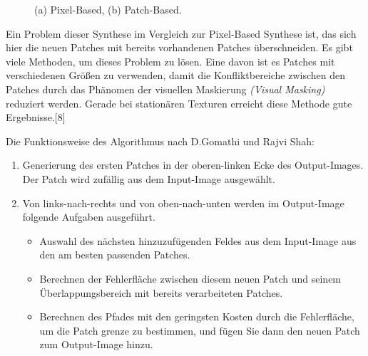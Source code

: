 \documentclass[12pt]{report}
\begin{document}
\begin{figure}[H]
    \centering
    \qquad
    \caption{(a) Pixel-Based, (b) Patch-Based.}%
\end{figure}

Ein Problem dieser Synthese im Vergleich zur Pixel-Based Synthese ist, das sich hier die neuen Patches mit bereits vorhandenen Patches überschneiden.
Es gibt viele Methoden, um dieses Problem zu lösen.
Eine davon ist es Patches mit verschiedenen Größen zu verwenden, damit die Konfliktbereiche zwischen den Patches durch das Phänomen der visuellen Maskierung
\textit{(Visual Masking)} reduziert werden.
Gerade bei stationären Texturen erreicht diese Methode gute Ergebnisse.{[8]}

Die Funktionsweise des Algorithmus nach D.Gomathi und Rajvi Shah:

\begin{enumerate}
    \item Generierung des ersten Patches in der oberen-linken Ecke des Output-Images. Der Patch wird zufällig aus dem Input-Image ausgewählt.
    \item Von links-nach-rechts und von oben-nach-unten werden im Output-Image folgende Aufgaben ausgeführt.
    \begin{itemize}
        \item Auswahl des nächsten hinzuzufügenden Feldes aus dem Input-Image aus den am besten passenden Patches.
        \item Berechnen der Fehlerfläche zwischen diesem neuen Patch und seinem Überlappungsbereich mit bereits
        verarbeiteten Patches.
        \item Berechnen des Pfades mit den geringsten Kosten durch die Fehlerfläche, um die Patch grenze zu bestimmen, und fügen Sie dann den neuen Patch zum Output-Image hinzu.
    \end{itemize}
\end{enumerate}
\end{document}
